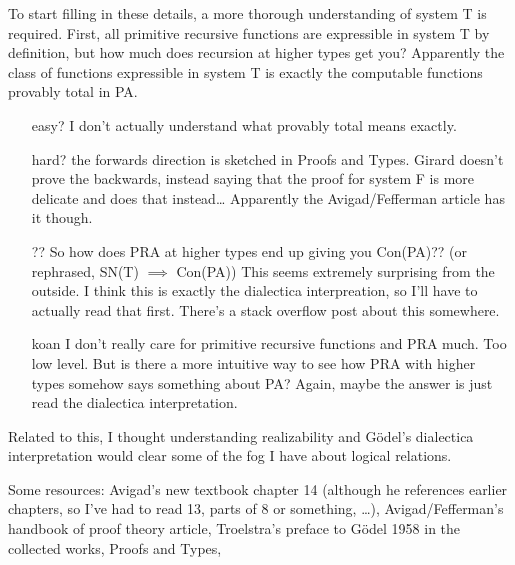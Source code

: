 \documentclass[
	fontsize=10pt, %
	twoside=false, %
	secnumdepth=-1, %
]{kaobook}
\theoremstyle{break}
\begin{document}
        To start filling in these details,
        a more thorough understanding of system T is required.
        First, all primitive recursive functions are expressible in system T
        by definition,
        but how much does recursion at higher types get you?
        Apparently the class of functions expressible in system T is exactly
        the computable functions provably total in PA.
        \begin{itemize}
            \item[easy?] I don't actually understand what provably total means exactly.
            \item[hard?] the forwards direction is sketched in Proofs and Types.
                Girard doesn't prove the backwards,
                instead saying that the proof for system F is more delicate
                and does that instead… Apparently the Avigad/Fefferman article has it though.
            \item[??] So how does PRA at higher types end up giving you Con(PA)??
                (or rephrased, SN(T) $⟹$ Con(PA))
                This seems extremely surprising from the outside.
                I think this is exactly the dialectica interpreation,
                so I'll have to actually read that first.
                There's a stack overflow post about this somewhere.
            \item[koan] I don't really care for primitive recursive functions
                and PRA much. Too low level.
                But is there a more intuitive way to see how PRA with higher types
                somehow says something about PA?
                Again, maybe the answer is just read the dialectica interpretation.
        \end{itemize}

        Related to this,
        I thought understanding realizability and Gödel's dialectica interpretation
        would clear some of the fog I have about logical relations.

        Some resources: 
        Avigad's new textbook chapter 14 (although he references earlier chapters,
        so I've had to read 13, parts of 8 or something, …),
        Avigad/Fefferman's handbook of proof theory article,
        Troelstra's preface to Gödel 1958 in the collected works,
        Proofs and Types,

%
%
%
%
%
\end{document}
